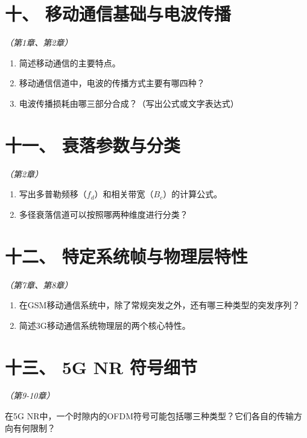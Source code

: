 \documentclass[12pt, a4paper]{ctexart}
\begin{document}
\section*{十、 移动通信基础与电波传播}
\textit{（第1章、第2章）}

\begin{enumerate}[label=(\arabic*)]
    \item 简述移动通信的主要特点。
    \item 移动通信信道中，电波的传播方式主要有哪四种？
    \item 电波传播损耗由哪三部分合成？（写出公式或文字表达式）
\end{enumerate}

\vfill

\section*{十一、 衰落参数与分类}
\textit{（第2章）}

\begin{enumerate}[label=(\arabic*)]
    \item 写出多普勒频移（$f_d$）和相关带宽（$B_c$）的计算公式。
    \item 多径衰落信道可以按照哪两种维度进行分类？
\end{enumerate}

\vfill
\newpage

\section*{十二、 特定系统帧与物理层特性}
\textit{（第7章、第8章）}

\begin{enumerate}[label=(\arabic*)]
    \item 在GSM移动通信系统中，除了常规突发之外，还有哪三种类型的突发序列？
    \item 简述3G移动通信系统物理层的两个核心特性。
\end{enumerate}

\vfill

\section*{十三、 5G NR 符号细节}
\textit{（第9-10章）}

在5G NR中，一个时隙内的OFDM符号可能包括哪三种类型？它们各自的传输方向有何限制？

\vfill
\end{document}
